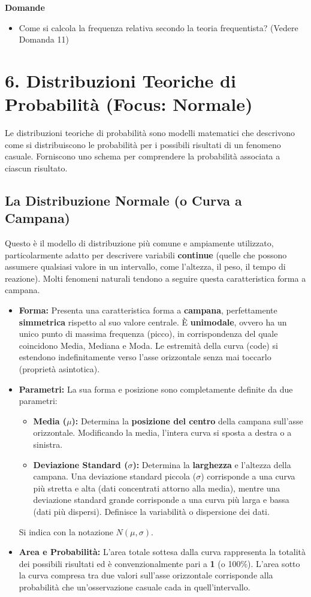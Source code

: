 \documentclass[12pt, a4paper]{article}
\newenvironment{reflectionbox}{%
    \medskip %
    \begin{framed}\par\noindent
    \textbf{\color{boxtitlecolor}Domande} \par
    \begin{itemize}[leftmargin=*, label=$\blacktriangleright$]
}{%
    \end{itemize}\par
    \end{framed}
    \medskip %
}
\newcommand{\popmean}{\mu} %
\newcommand{\popsd}{\sigma} %
\begin{document}
\begin{reflectionbox}
    \item Come si calcola la frequenza relativa secondo la teoria frequentista? (Vedere Domanda 11)
\end{reflectionbox}

\section*{6. Distribuzioni Teoriche di Probabilità (Focus: Normale)}
Le distribuzioni teoriche di probabilità sono modelli matematici che descrivono come si distribuiscono le probabilità per i possibili risultati di un fenomeno casuale. Forniscono uno schema per comprendere la probabilità associata a ciascun risultato.

\subsection*{La Distribuzione Normale (o Curva a Campana)}
Questo è il modello di distribuzione più comune e ampiamente utilizzato, particolarmente adatto per descrivere variabili \textbf{continue} (quelle che possono assumere qualsiasi valore in un intervallo, come l'altezza, il peso, il tempo di reazione). Molti fenomeni naturali tendono a seguire questa caratteristica forma a campana.

\begin{itemize}
    \item \textbf{Forma:} Presenta una caratteristica forma a \textbf{campana}, perfettamente \textbf{simmetrica} rispetto al suo valore centrale. È \textbf{unimodale}, ovvero ha un unico punto di massima frequenza (picco), in corrispondenza del quale coincidono Media, Mediana e Moda. Le estremità della curva (code) si estendono indefinitamente verso l'asse orizzontale senza mai toccarlo (proprietà asintotica).
    \item \textbf{Parametri:} La sua forma e posizione sono completamente definite da due parametri:
        \begin{itemize}
            \item \textbf{Media ($\popmean$):} Determina la \textbf{posizione del centro} della campana sull'asse orizzontale. Modificando la media, l'intera curva si sposta a destra o a sinistra.
            \item \textbf{Deviazione Standard ($\popsd$):} Determina la \textbf{larghezza} e l'altezza della campana. Una deviazione standard piccola ($\popsd$) corrisponde a una curva più stretta e alta (dati concentrati attorno alla media), mentre una deviazione standard grande corrisponde a una curva più larga e bassa (dati più dispersi). Definisce la variabilità o dispersione dei dati.
        \end{itemize}
        Si indica con la notazione $N(\popmean, \popsd)$.
    \item \textbf{Area e Probabilità:} L'area totale sottesa dalla curva rappresenta la totalità dei possibili risultati ed è convenzionalmente pari a \textbf{1} (o 100\%). L'area sotto la curva compresa tra due valori sull'asse orizzontale corrisponde alla probabilità che un'osservazione casuale cada in quell'intervallo.
\end{itemize}
\end{document}
